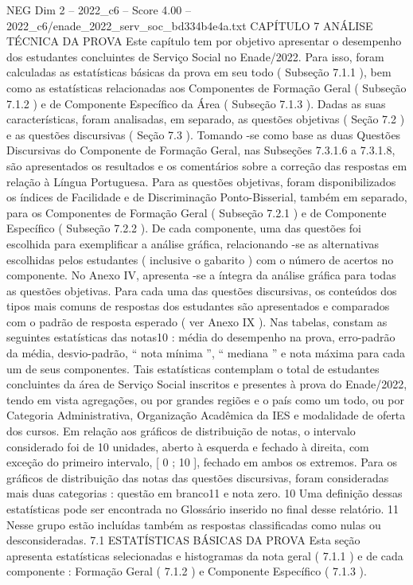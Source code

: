 \begin{textsample}{NEG Dim 2 – 2022\_c6 – Score 4.00 – 2022\_c6/enade\_2022\_serv\_soc\_bd334b4e4a.txt}  \label{ex:f2_neg_297}
CAPÍTULO 7 ANÁLISE TÉCNICA DA PROVA Este capítulo tem por objetivo apresentar o desempenho dos estudantes concluintes de Serviço Social no Enade/2022.
Para isso, foram calculadas as estatísticas básicas da prova em seu todo ( Subseção 7.1.1 ), bem como as estatísticas relacionadas aos Componentes de Formação Geral ( Subseção 7.1.2 ) e de Componente Específico da Área ( Subseção 7.1.3 ).
Dadas as suas características, foram analisadas, em separado, as questões objetivas ( Seção 7.2 ) e as questões discursivas ( Seção 7.3 ).
Tomando -se como base as duas Questões Discursivas do Componente de Formação Geral, nas Subseções 7.3.1.6 a 7.3.1.8, são apresentados os resultados e os comentários sobre a correção das respostas em relação à Língua Portuguesa.
Para as questões objetivas, foram disponibilizados os índices de Facilidade e de Discriminação Ponto-Bisserial, também em separado, para os Componentes de Formação Geral ( Subseção 7.2.1 ) e de Componente Específico ( Subseção 7.2.2 ).
De cada componente, uma das questões foi escolhida para exemplificar a análise gráfica, relacionando -se as alternativas escolhidas pelos estudantes ( inclusive o gabarito ) com o número de acertos no componente.
No Anexo IV, apresenta -se a íntegra da análise gráfica para todas as questões objetivas.
Para cada uma das questões discursivas, os conteúdos dos tipos mais comuns de respostas dos estudantes são apresentados e comparados com o padrão de resposta esperado ( ver Anexo IX ).
Nas tabelas, constam as seguintes estatísticas das notas10 : média do desempenho na prova, erro-padrão da média, desvio-padrão, “ nota mínima ”, “ mediana ” e nota máxima para cada um de seus componentes.
Tais estatísticas contemplam o total de estudantes concluintes da área de Serviço Social inscritos e presentes à prova do Enade/2022, tendo em vista agregações, ou por grandes regiões e o país como um todo, ou por Categoria Administrativa, Organização Acadêmica da IES e modalidade de oferta dos cursos.
Em relação aos gráficos de distribuição de notas, o intervalo considerado foi de 10 unidades, aberto à esquerda e fechado à direita, com exceção do primeiro intervalo, [ 0 ; 10 ], fechado em ambos os extremos.
Para os gráficos de distribuição das notas das questões discursivas, foram consideradas mais duas categorias : questão em branco11 e nota zero. 10 Uma definição dessas estatísticas pode ser encontrada no Glossário inserido no final desse relatório. 11 Nesse grupo estão incluídas também as respostas classificadas como nulas ou desconsideradas. 7.1 ESTATÍSTICAS BÁSICAS DA PROVA Esta seção apresenta estatísticas selecionadas e histogramas da nota geral ( 7.1.1 ) e de cada componente : Formação Geral ( 7.1.2 ) e Componente Específico ( 7.1.3 ).

\end{textsample}
